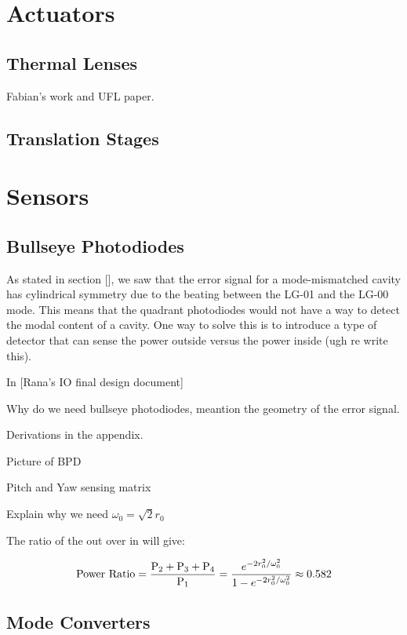 \documentclass[oneside]{book}
\begin{document}
	\section{Actuators}
		\subsection{Thermal Lenses}
		Fabian's work and UFL paper.
		\subsection{Translation Stages}
		
	\section{Sensors}
		\subsection{Bullseye Photodiodes}
		As stated in section [], we saw that the error signal for a mode-mismatched cavity has cylindrical symmetry due to the beating between the LG-01 and the LG-00 mode.  This means that the quadrant photodiodes would not have a way to detect the modal content of a cavity.  One way to solve this is to introduce a type of detector that can sense the power outside versus the power inside (ugh re write this).
		
		In [Rana's IO final design document] 
		
		
		Why do we need bullseye photodiodes, meantion the geometry of the error signal.
		
		Derivations in the appendix.
		
		Picture of BPD
		
		Pitch and Yaw sensing matrix
		
		Explain why we need $\omega_{0} = \sqrt{2} r_0$
		
		The ratio of the out over in will give:
		
		\begin{equation}
		\text{Power Ratio} = \frac{\text{P}_2 + \text{P}_3 + \text{P}_4}{\text{P}_1}  \\
		= \frac{e^{-2r_0^2/ \omega_{0}^2}} {1 - e^{-2r_0^2/ \omega_{0}^2 }} \approx 0.582
		\end{equation}
		
		\subsection{Mode Converters}
		
\end{document}
